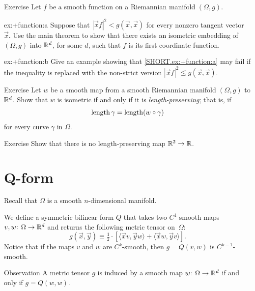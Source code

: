 \begin{thm}{Exercise}\label{ex:+function}
Let $f$ be a smooth function on a Riemannian manifold $(\Omega, g)$.

\begin{subthm}{ex:+function:a}
Suppose that $|\vec x f|^2 < g(\vec x, \vec x)$ for every nonzero tangent vector~$\vec x$.
Use the main theorem to show that there exists an isometric embedding of $(\Omega, g)$ into $\mathbb{R}^d$, for some $d$, such that $f$ is its first coordinate function.
\end{subthm}

\begin{subthm}{ex:+function:b}
Give an example showing that \ref{SHORT.ex:+function:a} may fail if the inequality is replaced with the non-strict version $|\vec x f|^2 \le g(\vec x, \vec x)$.
\end{subthm}

\end{thm}



\begin{thm}{Exercise}\label{ex:length-preserving}
Let $w$ be a smooth map from a smooth Riemannian manifold $(\Omega, g)$ to $\mathbb{R}^d$.
Show that $w$ is isometric if and only if it is \emph{length-preserving};
that is, if
\[\mathop{\rm length}\nolimits \gamma = \mathop{\rm length}\nolimits(w \circ \gamma)\]
for every curve $\gamma$ in $\Omega$.
\end{thm}

\begin{thm}{Exercise}\label{ex:R2->R}
Show that there is no length-preserving map $\mathbb{R}^2\to\mathbb{R}$.
\end{thm}


\section{Q-form}

Recall that $\Omega$ is a smooth $n$-dimensional manifold.

We define a symmetric bilinear form $Q$ that takes two $C^1$-smooth maps $v, w\colon\Omega \to \mathbb{R}^d$ and returns the following metric tensor on~$\Omega$:
\[
g(\vec x, \vec y)
\equiv
\tfrac{1}{2} \cdot [\langle \vec x v, \vec y w \rangle + \langle \vec x w, \vec y v \rangle].
\]
Notice that if the maps $v$ and $w$ are $C^k$-smooth, then $g = Q(v, w)$ is $C^{k-1}$-smooth.

\begin{thm}{Observation}
A metric tensor $g$ is induced by a smooth map $w\colon\Omega \to \mathbb{R}^d$
if and only if $g = Q(w, w)$.
\end{thm}


